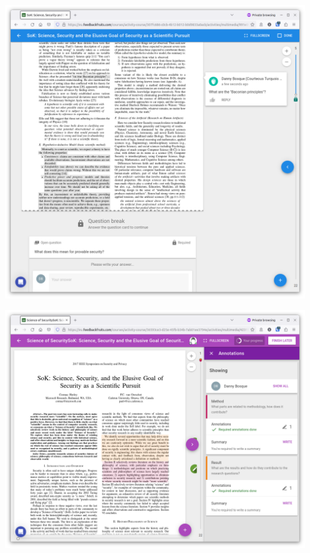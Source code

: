 \begin{marginfigure}
  \includegraphics[width=\columnwidth]{figs/fbf-doc-quiz-question.png}
  \caption{%
    An interactive document in FeedbackFruits where one can answer quiz 
    questions posed in the document and ask questions about the content.%
  }\label{fbfdocquiz}
\end{marginfigure}

\begin{marginfigure}
  \includegraphics[width=\columnwidth]{figs/fbf-doc-annotations.png}
  \caption{%
    An interactive document in FeedbackFruits where one can annotate the text 
    with focused topics together with other students in the class.%
  }\label{fbfdocannotation}
\end{marginfigure}


